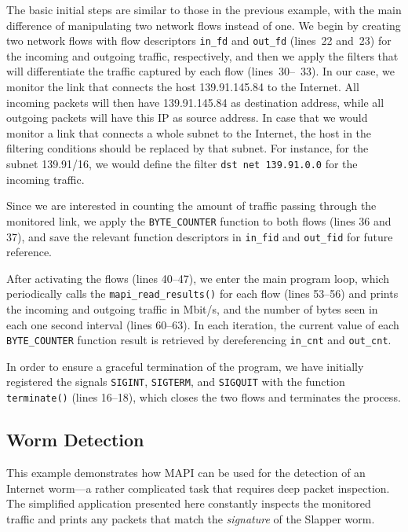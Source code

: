 \documentclass[a4paper, 11pt]{article}
\begin{document}
The basic initial steps are similar to those in the previous example, with
the main difference of manipulating two network flows instead of one.
We begin by creating two network flows
with flow descriptors {\tt in\_fd} and {\tt out\_fd} (lines~22 and~23)
for the incoming and outgoing traffic, respectively, and then we
apply the filters that will differentiate the traffic captured
by each flow (lines~30--~33).
In our case, we monitor the link that connects the host
139.91.145.84 to the Internet. All incoming packets will then have
139.91.145.84 as destination address,
while all outgoing packets will have this IP as source address.
In case that we would monitor a link that connects a whole subnet
to the Internet, the host in the filtering conditions should be replaced
by that subnet. For instance, for the subnet 139.91/16,
we would define the filter {\tt dst net 139.91.0.0} for the incoming traffic.

Since we are interested in counting the amount of traffic
passing through the monitored link,
we apply the {\tt BYTE\_COUNTER} function to both flows (lines 36 and 37),
and save the relevant function descriptors in {\tt in\_fid} and {\tt out\_fid}
for future reference.

After activating the flows (lines 40--47), we enter the main program loop, 
which periodically calls the 
{\tt mapi\_read\_results()} for each flow (lines 53--56) and
prints the incoming and outgoing traffic in Mbit/s, and the number of bytes
seen in each one second interval (lines 60--63).
In each iteration, the current value of each  {\tt BYTE\_COUNTER} function
result is retrieved by dereferencing {\tt in\_cnt} and {\tt out\_cnt}.

In order to ensure a graceful termination of the program, we have initially
registered the signals {\tt SIGINT}, {\tt SIGTERM}, and {\tt SIGQUIT} with
the function {\tt terminate()} (lines 16--18),
which closes the two flows and terminates the process.

\subsection{Worm Detection}

This example demonstrates how MAPI can be used for the detection of an
Internet worm---a rather complicated task that requires deep packet
inspection. The simplified application presented here
constantly inspects the monitored traffic and
prints any packets that match the {\em signature} of the Slapper worm.
\end{document}
